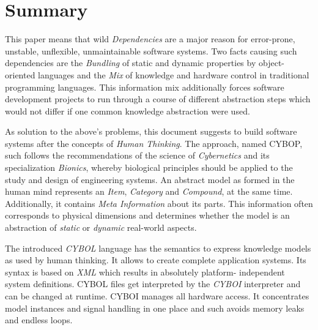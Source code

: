 %
%
%
%
%
%
%

\section{Summary}
\label{summary_heading}

This paper means that wild \emph{Dependencies} are a major reason for error-prone,
unstable, unflexible, unmaintainable software systems. Two facts causing such
dependencies are the \emph{Bundling} of static and dynamic properties by
object-oriented languages and the \emph{Mix} of knowledge and hardware control
in traditional programming languages. This information mix additionally forces
software development projects to run through a course of different abstraction
steps which would not differ if one common knowledge abstraction were used.

As solution to the above's problems, this document suggests to build software
systems after the concepts of \emph{Human Thinking}. The approach, named CYBOP,
such follows the recommendations of the science of \emph{Cybernetics} and its
specialization \emph{Bionics}, whereby biological principles should be applied
to the study and design of engineering systems. An abstract model as formed in the
human mind represents an \emph{Item}, \emph{Category} and \emph{Compound}, at the
same time. Additionally, it contains \emph{Meta Information} about its parts.
This information often corresponds to physical dimensions and determines whether
the model is an abstraction of \emph{static} or \emph{dynamic} real-world aspects.

The introduced \emph{CYBOL} language has the semantics to express knowledge models
as used by human thinking. It allows to create complete application systems. Its
syntax is based on \emph{XML} which results in absolutely platform- independent
system definitions. CYBOL files get interpreted by the \emph{CYBOI} interpreter
and can be changed at runtime. CYBOI manages all hardware access. It concentrates
model instances and signal handling in one place and such avoids memory leaks and
endless loops.


